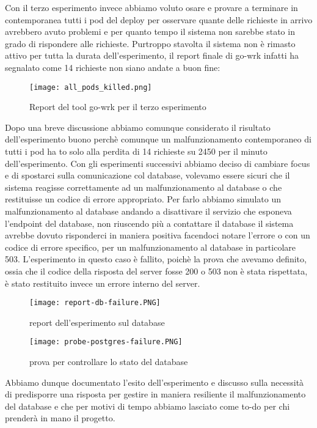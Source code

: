 Con il terzo esperimento invece abbiamo voluto osare e provare a terminare in contemporanea tutti i pod del deploy per osservare quante delle richieste in arrivo avrebbero avuto problemi e per quanto tempo il sistema non sarebbe stato in grado di rispondere alle richieste.
Purtroppo stavolta il sistema non è rimasto attivo per tutta la durata dell'esperimento, il report finale di go-wrk infatti ha segnalato come 14 richieste non siano andate a buon fine:
\begin{figure}[h]
    \centering
    \texttt{[image: all\_pods\_killed.png]}
    \caption{Report del tool go-wrk per il terzo esperimento}
    \label{tab:report-all-pods-killed}
\end{figure}
Dopo una breve discussione abbiamo comunque considerato il risultato dell'esperimento buono perchè comunque un malfunzionamento contemporaneo di tutti i pod ha to solo alla perdita di 14 richieste su 2450 per il minuto dell'esperimento.
Con gli esperimenti successivi abbiamo deciso di cambiare focus e di spostarci sulla comunicazione col database, volevamo essere sicuri che il sistema reagisse correttamente ad un malfunzionamento al database o che restituisse un codice di errore appropriato.
Per farlo abbiamo simulato un malfunzionamento al database andando a disattivare il servizio che esponeva l'endpoint del database, non riuscendo più a contattare il database il sistema avrebbe dovuto risponderci in maniera positiva facendoci notare l'errore o con un codice di errore specifico, per un malfunzionamento al database in particolare 503.
L'esperimento in questo caso è fallito, poichè la prova che avevamo definito, ossia che il codice della risposta del server fosse 200 o 503 non è stata rispettata, è stato restituito invece un errore interno del server.
\begin{figure}[h]
    \centering
    \texttt{[image: report-db-failure.PNG]}
    \caption{report dell'esperimento sul database}
    \label{tab:report-database-experiment}
\end{figure}
\begin{figure}[h]
    \centering
    \texttt{[image: probe-postgres-failure.PNG]}
    \caption{prova per controllare lo stato del database}
    \label{tab:report-database-experiment}
\end{figure}
Abbiamo dunque documentato l'esito dell'esperimento e discusso sulla necessità di predisporre una risposta per gestire in maniera resiliente il malfunzionamento del database e che per motivi di tempo abbiamo lasciato come to-do per chi prenderà in mano il progetto.
